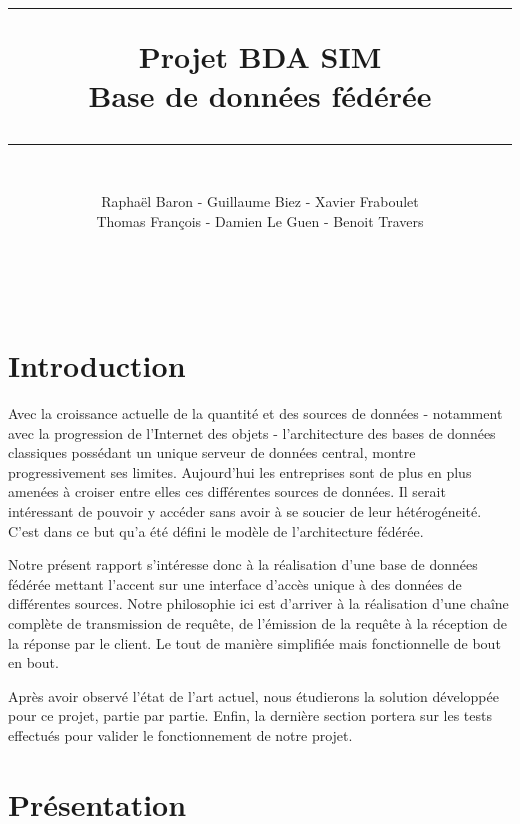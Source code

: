 \documentclass[a4paper,10pt]{article}
\title{\hrule \bigskip Projet BDA SIM \\ Base de données fédérée \bigskip \hrule}
\author{~~\\ Raphaël Baron - Guillaume Biez - Xavier Fraboulet \\ Thomas François - Damien Le Guen - Benoit Travers}
\begin{document}
\maketitle
\thispagestyle{empty}
\newpage

~~\\
\thispagestyle{empty}
\newpage

\tableofcontents

\newpage
\section{Introduction}
Avec la croissance actuelle de la quantité et des sources de données - notamment avec la progression de l'Internet des objets - l'architecture des bases de données classiques possédant un unique serveur de données central, montre progressivement ses limites. Aujourd'hui les entreprises sont de plus en plus amenées à croiser entre elles ces différentes sources de données. Il serait intéressant de pouvoir y accéder sans avoir à se soucier de leur hétérogéneité. C'est dans ce but qu'a été défini le modèle de l'architecture fédérée.

Notre présent rapport s'intéresse donc à la réalisation d'une base de données fédérée mettant l'accent sur une interface d'accès unique à des données de différentes sources. Notre philosophie ici est d'arriver à la réalisation d'une chaîne complète de transmission de requête, de l'émission de la requête à la réception de la réponse par le client. Le tout de manière simplifiée mais fonctionnelle de bout en bout.

Après avoir observé l'état de l'art actuel, nous étudierons la solution développée pour ce projet, partie par partie. Enfin, la dernière section portera sur les tests effectués pour valider le fonctionnement de notre projet.





\newpage
\section{Présentation}
\end{document}
